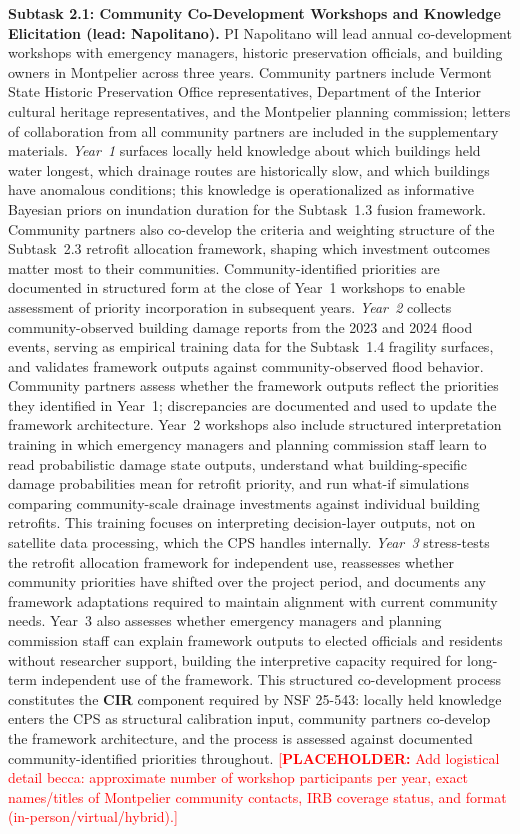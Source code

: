 \documentclass[11pt]{article}
\newcommand{\placeholder}[1]{\textcolor{red}{[\textbf{PLACEHOLDER:} #1]}}
\begin{document}
\textbf{Subtask 2.1: Community Co-Development Workshops and Knowledge Elicitation (lead: Napolitano).}
PI Napolitano will lead annual co-development workshops with emergency managers, historic preservation officials, and building owners in Montpelier across three years.
Community partners include Vermont State Historic Preservation Office representatives, Department of the Interior cultural heritage representatives, and the Montpelier planning commission; letters of collaboration from all community partners are included in the supplementary materials.
\textit{Year~1} surfaces locally held knowledge about which buildings held water longest, which drainage routes are historically slow, and which buildings have anomalous conditions; this knowledge is operationalized as informative Bayesian priors on inundation duration for the Subtask~1.3 fusion framework. Community partners also co-develop the criteria and weighting structure of the Subtask~2.3 retrofit allocation framework, shaping which investment outcomes matter most to their communities. Community-identified priorities are documented in structured form at the close of Year~1 workshops to enable assessment of priority incorporation in subsequent years.
\textit{Year~2} collects community-observed building damage reports from the 2023 and 2024 flood events, serving as empirical training data for the Subtask~1.4 fragility surfaces, and validates framework outputs against community-observed flood behavior. Community partners assess whether the framework outputs reflect the priorities they identified in Year~1; discrepancies are documented and used to update the framework architecture. Year~2 workshops also include structured interpretation training in which emergency managers and planning commission staff learn to read probabilistic damage state outputs, understand what building-specific damage probabilities mean for retrofit priority, and run what-if simulations comparing community-scale drainage investments against individual building retrofits. This training focuses on interpreting decision-layer outputs, not on satellite data processing, which the CPS handles internally.
\textit{Year~3} stress-tests the retrofit allocation framework for independent use, reassesses whether community priorities have shifted over the project period, and documents any framework adaptations required to maintain alignment with current community needs. Year~3 also assesses whether emergency managers and planning commission staff can explain framework outputs to elected officials and residents without researcher support, building the interpretive capacity required for long-term independent use of the framework.
This structured co-development process constitutes the \textbf{CIR} component required by NSF 25-543: locally held knowledge enters the CPS as structural calibration input, community partners co-develop the framework architecture, and the process is assessed against documented community-identified priorities throughout.
\placeholder{Add logistical detail becca: approximate number of workshop participants per year, exact names/titles of Montpelier community contacts, IRB coverage status, and format (in-person/virtual/hybrid).}
\end{document}
